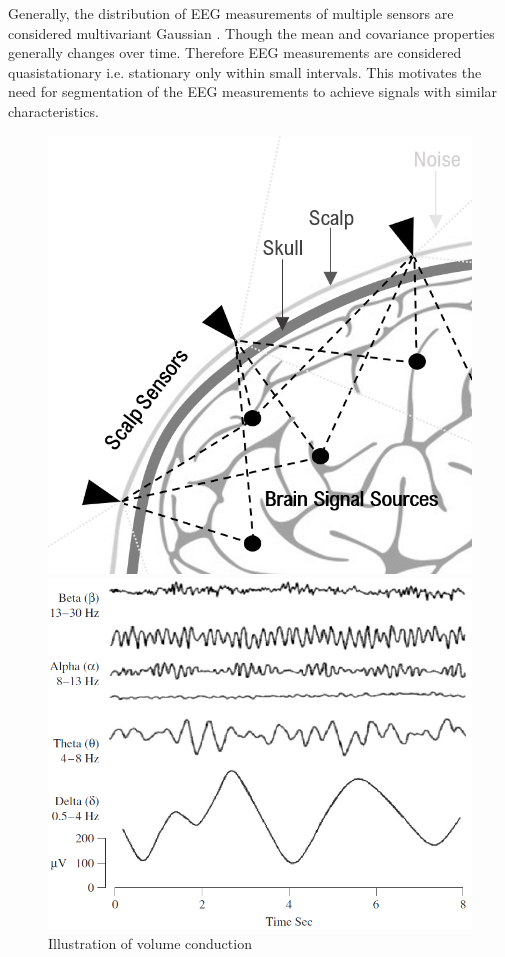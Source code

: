 Generally, the distribution of EEG measurements of multiple sensors are considered multivariant Gaussian \cite[p. 50]{EEGsignalprocessing}. Though the mean and covariance properties generally changes over time. Therefore EEG measurements are considered quasistationary i.e. stationary only within small intervals. This motivates the need for segmentation of the EEG measurements to achieve signals with similar characteristics. 

\begin{figure}[H]
    \begin{minipage}[t]{.45\textwidth}
        \centering
        \includegraphics[width=\textwidth]{figures/EEG/volumeconduction.png}
        \caption{Illustration of volume conduction}\label{fig:volumeconduction}
    \end{minipage} 
    \hfill
    \begin{minipage}[t]{.45\textwidth}
        \centering
        \includegraphics[width=\textwidth]{figures/EEG/EEG_example.png}

\end{minipage}
\end{figure}
